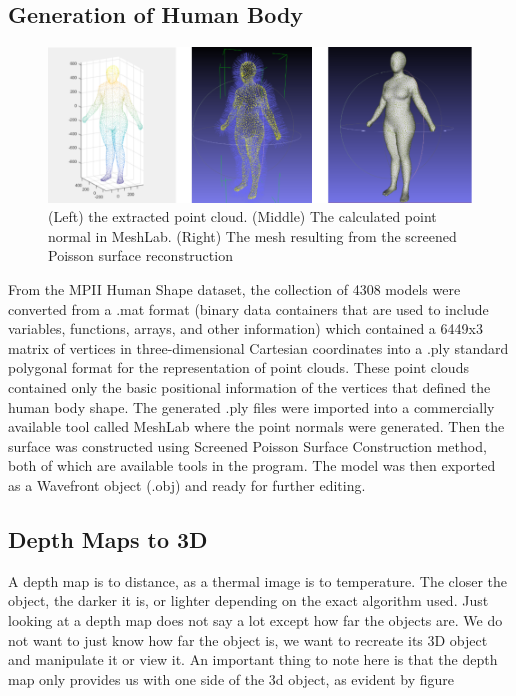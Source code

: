\documentclass{article}
\begin{document}
    
    \subsection{Generation of Human Body}
    
    \begin{figure}[h]
        \centering
        \includegraphics{images/humanModel.png}
        \caption{(Left) the extracted point cloud. (Middle) The calculated point normal in MeshLab. (Right) The mesh resulting from the screened Poisson surface reconstruction}
        \label{(Left) the extracted point cloud. (Middle) The calculated point normal in MeshLab. (Right) The mesh resulting from the screened Poisson surface reconstruction(Left) the extracted point cloud. (Middle) The calculated point normal in MeshLab. (Right) The mesh resulting from the screened Poisson surface reconstruction}
    \end{figure}
    From the MPII Human Shape dataset, the collection of 4308 models were converted from a .mat format (binary data containers that are used to include variables, functions, arrays, and other information) which contained a 6449x3 matrix of vertices in three-dimensional Cartesian coordinates into a .ply standard polygonal format for the representation of point clouds. These point clouds contained only the basic positional information of the vertices that defined the human body shape. The generated .ply files were imported into a commercially available tool called MeshLab where the point normals were generated. Then the surface was constructed using Screened Poisson Surface Construction method, both of which are available tools in the program. The model was then exported as a Wavefront object (.obj) and ready for further editing.
    
    \subsection{Depth Maps to 3D}
    
    A depth map is to distance, as a thermal image is to temperature. The closer the object, the darker it is, or lighter depending on the exact algorithm used. Just looking at a depth map does not say a lot except how far the objects are. We do not want to just know how far the object is, we want to recreate its 3D object and manipulate it or view it. An important thing to note here is that the depth map only provides us with one side of the 3d object, as evident by figure 
\end{document}
